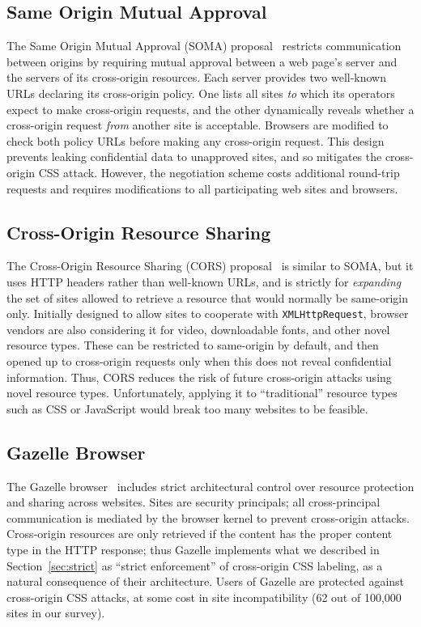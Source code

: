 \documentclass{sig-alternate}
\begin{document}
\subsection{Same Origin Mutual Approval}
The Same Origin Mutual Approval (SOMA) proposal~\cite{soma} restricts
communication between origins by requiring mutual approval between a
web page's server and the servers of its cross-origin resources.  Each
server provides two well-known URLs declaring its cross-origin policy.
One lists all sites \emph{to} which its operators expect to make
cross-origin requests, and the other dynamically reveals whether a
cross-origin request \emph{from} another site is acceptable.  Browsers
are modified to check both policy URLs before making any cross-origin
request.  This design prevents leaking confidential data to unapproved
sites, and so mitigates the cross-origin CSS attack. However, the
negotiation scheme costs additional round-trip requests and requires
modifications to all participating web sites and browsers.

\subsection{Cross-Origin Resource Sharing}
The Cross-Origin Resource Sharing (CORS) proposal~\cite{cors} is
similar to SOMA, but it uses HTTP headers rather than well-known URLs,
and is strictly for \emph{expanding} the set of sites allowed to
retrieve a resource that would normally be same-origin only.
Initially designed to allow sites to cooperate with
\texttt{XMLHttpRequest}, browser vendors are also considering it for
video, downloadable fonts, and other novel resource types.  These can
be restricted to same-origin by default, and then opened up to
cross-origin requests only when this does not reveal confidential
information.  Thus, CORS reduces the risk of future cross-origin
attacks using novel resource types.  Unfortunately, applying it to
“traditional” resource types such as CSS or JavaScript would break too
many websites to be feasible.

\subsection{Gazelle Browser}
The Gazelle browser~\cite{gazelle} includes strict architectural
control over resource protection and sharing across websites.  Sites
are security principals; all cross-principal communication is mediated
by the browser kernel to prevent cross-origin attacks.  Cross-origin
resources are only retrieved if the content has the proper content
type in the HTTP response; thus Gazelle implements what we described
in Section~\ref{sec:strict} as “strict enforcement” of cross-origin
CSS labeling, as a natural consequence of their architecture.  Users
of Gazelle are protected against cross-origin CSS attacks, at some
cost in site incompatibility (62 out of 100,000 sites in our survey).
\end{document}
